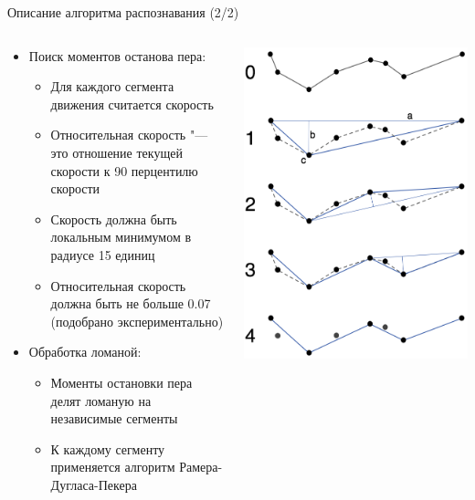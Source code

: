 \documentclass[utf8,xcolor=table]{beamer}
\begin{document}
\begin{frame}[t]{Описание алгоритма распознавания (2/2)}
  \begin{columns}[T]
  \begin{column}{.6\textwidth}
    \begin{itemize}
    \item Поиск моментов останова пера:
      \begin{itemize}
      \item Для каждого сегмента движения считается скорость
      \item Относительная скорость "--- это отношение текущей скорости к 90 перцентилю скорости
      \item Скорость должна быть локальным минимумом в радиусе 15 единиц
      \item Относительная скорость должна быть не больше 0.07 (подобрано экспериментально)
      \end{itemize}
    \item Обработка ломаной:
      \begin{itemize}
      \item Моменты остановки пера делят ломаную на независимые сегменты
      \item К каждому сегменту применяется алгоритм Рамера-Дугласа-Пекера
      \end{itemize}
    \end{itemize}
  \end{column}
  \begin{column}{.4\textwidth}
    \includegraphics[width=\textwidth]{Douglas_Peucker}

\end{column}
\end{columns}
\end{frame}
\end{document}
